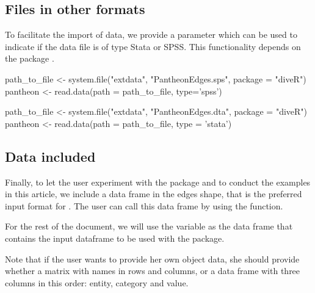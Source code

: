 \subsection{Files in other formats}
To facilitate the import of data, we provide a parameter  which can be used to indicate if the data file is of type Stata or SPSS. This functionality depends on the package .

\begin{example}
     path_to_file <- system.file("extdata", "PantheonEdges.sps", package = "diveR")
     pantheon <-  read.data(path = path_to_file, type='spss')
     
     path_to_file <- system.file("extdata", "PantheonEdges.dta", package = "diveR")
     pantheon <- read.data(path = path_to_file, type = 'stata')
\end{example}
 
\subsection{Data included}

Finally, to let the user experiment with the package and to conduct the examples in this article, we include a data frame in the edges shape, that is the preferred input format for . The user can call this data frame by using the  function. 



For the rest of the document, we will use the variable  as the data frame that contains the input dataframe to be used with the package.

Note that if the user wants to provide her own object data, she should provide whether a matrix with names in rows and columns, or a data frame with three columns in this order: entity, category and value.

